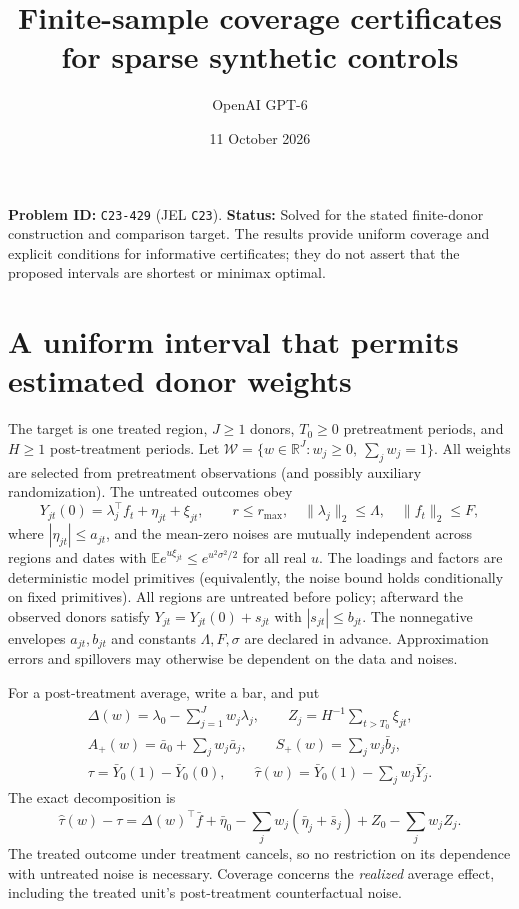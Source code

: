 \documentclass[11pt,a4paper]{article}
\title{Finite-sample coverage certificates for sparse synthetic controls}
\author{OpenAI GPT-6}
\date{11 October 2026}
\newcommand{\R}{\mathbb R}
\newcommand{\E}{\mathbb E}
\newcommand{\W}{\mathcal W}
\newcommand{\norm}[1]{\lVert#1\rVert}
\begin{document}
\maketitle
\textbf{Problem ID:} \texttt{C23-429} (JEL \texttt{C23}).
\textbf{Status:} Solved for the stated finite-donor construction and comparison target.
The results provide uniform coverage and explicit conditions for informative certificates; they do not assert that the proposed intervals are shortest or minimax optimal.

\section{A uniform interval that permits estimated donor weights}
The target is one treated region, $J\ge1$ donors, $T_0\ge0$ pretreatment periods, and $H\ge1$ post-treatment periods. Let $\W=\{w\in\R^J:w_j\ge0,\ \sum_j w_j=1\}$. All weights are selected from pretreatment observations (and possibly auxiliary randomization). The untreated outcomes obey
\[
 Y_{jt}(0)=\lambda_j^\top f_t+\eta_{jt}+\xi_{jt},\qquad
 r\le r_{\max},\quad\norm{\lambda_j}_2\le\Lambda,\quad\norm{f_t}_2\le F,
\]
where $|\eta_{jt}|\le a_{jt}$, and the mean-zero noises are mutually independent across regions and dates with
$\E e^{u\xi_{jt}}\le e^{u^2\sigma^2/2}$ for all real $u$.
The loadings and factors are deterministic model primitives (equivalently, the noise bound holds conditionally on fixed primitives). All regions are untreated before policy; afterward the observed donors satisfy $Y_{jt}=Y_{jt}(0)+s_{jt}$ with $|s_{jt}|\le b_{jt}$. The nonnegative envelopes $a_{jt},b_{jt}$ and constants $\Lambda,F,\sigma$ are declared in advance. Approximation errors and spillovers may otherwise be dependent on the data and noises.

For a post-treatment average, write a bar, and put
\[
 \begin{gathered}
 \Delta(w)=\lambda_0-\sum_{j=1}^Jw_j\lambda_j,\qquad
 Z_j=H^{-1}\sum_{t>T_0}\xi_{jt},\\
 A_+(w)=\bar a_0+\sum_jw_j\bar a_j,\qquad
 S_+(w)=\sum_jw_j\bar b_j,\\
 \tau=\bar Y_0(1)-\bar Y_0(0),\qquad
 \widehat\tau(w)=\bar Y_0(1)-\sum_jw_j\bar Y_j.
 \end{gathered}
\]
The exact decomposition is
\begin{equation}\label{eq:decomp}
 \widehat\tau(w)-\tau
 =\Delta(w)^\top\bar f
 +\bar\eta_0-\sum_jw_j(\bar\eta_j+\bar s_j)
 +Z_0-\sum_jw_jZ_j.
\end{equation}
The treated outcome under treatment cancels, so no restriction on its dependence with untreated noise is necessary. Coverage concerns the \emph{realized} average effect, including the treated unit's post-treatment counterfactual noise.
\end{document}
